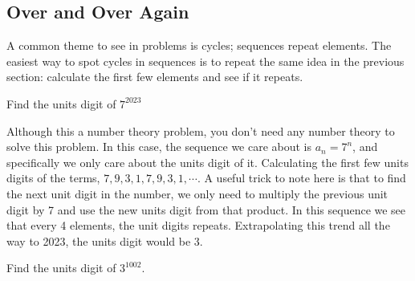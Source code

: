 \documentclass[11pt]{article}
\begin{document}
\subsection{Over and Over Again}
A common theme to see in problems is cycles; sequences repeat elements. The easiest way to spot cycles in sequences is to repeat the same idea in the previous section: calculate the first few elements and see if it repeats. 
\begin{example}
Find the units digit of $7^{2023}$
\end{example}
Although this a number theory problem, you don't need any number theory to solve this problem. In this case, the sequence we care about is $a_n = 7^n$, and specifically we only care about the units digit of it. Calculating the first few units digits of the terms, $7, 9, 3, 1, 7, 9, 3, 1, \cdots$. A useful trick to note here is that to find the next unit digit in the number, we only need to multiply the previous unit digit by 7 and use the new units digit from that product. In this sequence we see that every 4 elements, the unit digits repeats. Extrapolating this trend all the way to 2023, the units digit would be 3.
\begin{exercise}
Find the units digit of $3^{1002}$.
\end{exercise}
\end{document}
